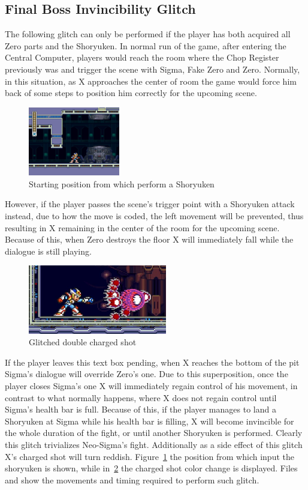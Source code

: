 \subsection{Final Boss Invincibility Glitch}\label{Final_battle_glitch}
The following glitch can only be performed if the player has both acquired all Zero parts and the Shoryuken. In normal run of the game, after entering the Central Computer, players would reach the room where the Chop Register previously was and trigger the scene with Sigma, Fake Zero and Zero. Normally, in this situation, as X approaches the center of room the game would force him back of some steps to position him correctly for the upcoming scene. 
\begin{figure}[htp]
	\centering
	\includegraphics[height=3cm]{figures/X2/Miscs/Sigma_glitch_start.png}
	\caption{Starting position from which perform a Shoryuken}
	\label{X2_sigma_glitch_start}
\end{figure}
However, if the player passes the scene's trigger point with a Shoryuken attack instead, due to how the move is coded, the left movement will be prevented, thus resulting in X remaining in the center of the room for the upcoming scene. Because of this, when Zero destroys the floor X will immediately fall while the dialogue is still playing.\begin{figure}[htp]
	\centering
	\includegraphics[height=3cm]{figures/X2/Miscs/glithced_double_shot.png}
	\caption{Glitched double charged shot}
	\label{X2_glitch_shot}
\end{figure} If the player leaves this text box pending, when X reaches the bottom of the pit Sigma's dialogue will override Zero's one. Due to this superposition, once the player closes Sigma's one X will immediately regain control of his movement, in contrast to what normally happens, where X does not regain control until Sigma's health bar is full. Because of this, if the player manages to land a Shoryuken at Sigma while his health bar is filling, X will become invincible for the whole duration of the fight, or until another Shoryuken is performed. Clearly this glitch trivializes Neo-Sigma's fight. Additionally as a side effect of this glitch X's charged shot will turn reddish.
Figure~\ref{X2_sigma_glitch_start} the position from which input the shoryuken is shown, while in~\ref{X2_glitch_shot} the charged shot color change is displayed. Files  and  show the movements and timing required to perform such glitch.

